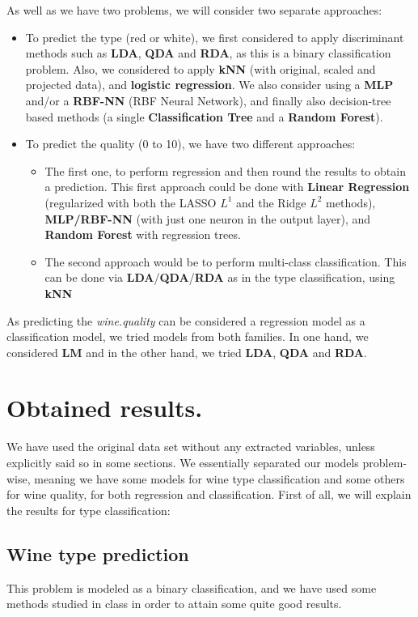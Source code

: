 \documentclass[10pt]{article}
\begin{document}
As well as we have two problems, we will consider two separate approaches:
\begin{itemize}
	\item To predict the type (red or white), we first considered to apply discriminant methods such as \textbf{LDA}, \textbf{QDA} and \textbf{RDA}, as this is a binary classification problem. Also, we considered to apply \textbf{kNN} (with original, scaled and projected data), and \textbf{logistic regression}. We also consider using a \textbf{MLP} and/or a \textbf{RBF-NN} (RBF Neural Network), and finally also decision-tree based methods (a single \textbf{Classification Tree} and a \textbf{Random Forest}).
	\item To predict the quality (0 to 10), we have two different approaches: 
	\begin{itemize}
		\item The first one, to perform regression and then round the results to obtain a prediction. This first approach could be done with \textbf{Linear Regression} (regularized with both the LASSO $L^1$ and the Ridge $L^2$ methods), \textbf{MLP/RBF-NN} (with just one neuron in the output layer), and \textbf{Random Forest} with regression trees.
		\item The second approach would be to perform multi-class classification. This can be done via \textbf{LDA}/\textbf{QDA}/\textbf{RDA} as in the type classification, using \textbf{kNN}
	\end{itemize}		
\end{itemize}

As predicting the \textit{wine.quality} can be considered a regression model as a classification model, we tried models from both families. In one hand, we considered \textbf{LM} and in the other hand, we tried \textbf{LDA}, \textbf{QDA} and \textbf{RDA}.

\section{Obtained results.}
We have used the original data set without any extracted variables, unless explicitly said so in some sections. We essentially separated our models problem-wise, meaning we have some models for wine type classification and some others for wine quality, for both regression and classification. First of all, we will explain the results for type classification:
\subsection{Wine type prediction}
This problem is modeled as a binary classification, and we have used some methods studied in class in order to attain some quite good results.\\
\end{document}

